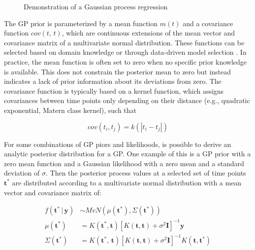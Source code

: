 \documentclass[man, floatsintext]{apa7}
\begin{document}
\begin{figure}[!t]
  \caption{Demonstration of a Gaussian process regression}
  \label{fig:gp_dem}
\end{figure}

The GP prior is parameterized by a mean function $m(t)$ and a covariance
function $cov(t, \, t)$, which are continuous extensions of the mean vector and
covariance matrix of a multivariate normal distribution. These functions can be
selected based on domain knowledge or through data-driven model selection
\parencite{richardson_gaussian_2017, abdessalem_automatic_2017}. In practice,
the mean function is often set to zero when no specific prior knowledge is
available. This does not constrain the posterior mean to zero but instead
indicates a lack of prior information about its deviations from zero. The
covariance function is typically based on a kernel function, which assigns
covariances between time points only depending on their distance (e.g.,
quadratic exponential, Matern class kernel), such that

\begin{equation}
  cov(t_i, t_j) = k(|t_i - t_j|)
\end{equation}

For some combinations of GP piors and likelihoods, is possible to derive an
analytic posterior distribution for a GP\@. One example of this is a GP prior
with a zero mean function and a Gaussian likelihood with a zero mean and a
standard deviation of $\sigma$. Then the posterior process values at a selected
set of time points $\textbf{t}^*$ are distributed according to a multivariate
normal distribution with a mean vector and covariance matrix of:

\begin{equation}
  \begin{aligned}
    f(\textbf{t}^* \, | \, \textbf{y}) & \sim MvN(\mu(\textbf{t}^*),
    \Sigma(\textbf{t}^*))
    \\
    \mu(\textbf{t}^*)                  & = K(\textbf{t}^*,
    \textbf{t}){[K(\textbf{t},
            \textbf{t}) + \sigma^2
            \textbf{I}]}^{-1}\textbf{y}
    \\
    \Sigma(\textbf{t}^*)               & =K(\textbf{t}^*, \,
    \textbf{t}){[K(\textbf{t},
            \textbf{t}) + \sigma^2
            \textbf{I}]}^{-1} K(\textbf{t}, \textbf{t}^*)
  \end{aligned}
\end{equation}
\end{document}
